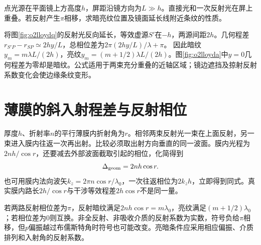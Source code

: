 \begin{example}\label{ex:o2lloyd}
点光源在平面镜上方高度$h$，屏距沿镜方向为$L\gg h$。直接光和一次反射光在屏上重叠。若反射产生$\pi$相移，求暗亮纹位置及镜面延长线附近条纹的性质。
\end{example}
\begin{solution}
将图\ref{fig:o2lloydq}的反射光反向延长，等效虚源$S'$在$-h$，两源间距$2h$。几何程差$r_{S'P}-r_{SP}\simeq2hy/L$，总相位差为$2\pi(2hy/L)/\lambda+\pi$。
因此暗纹$y_m=m\lambda L/(2h)$，亮纹$y_m=(m+1/2)\lambda L/(2h)$。图\ref{fig:o2lloyda}中$y=0$几何程差为零却是暗纹。公式适用于两束充分重叠的近轴区域；镜边遮挡及掠射反射系数变化会使边缘条纹变形。
\end{solution}

\section{薄膜的斜入射程差与反射相位}\label{th:o2film}
厚度$h$、折射率$n$的平行薄膜内折射角为$r$。相邻两束反射光一束在上面反射，另一束进入膜内往返一次再出射。比较必须取出射方向垂直的同一波面。膜内光程为$2nh/\cos r$，还要减去外部波面截取引起的相位，化简得到
\begin{equation}\label{eq:o2film}
 \Delta_{\rm geom}=2nh\cos r.
\end{equation}
也可用膜内法向波矢$k_z=2\pi n\cos r/\lambda_0$，一次往返相位为$2k_zh$，立即得到同式。真实膜内路长$2h/\cos r$与干涉等效程差$2h\cos r$不是同一量。

若两路反射相位差为$\pi$，反射暗纹满足$2nh\cos r=m\lambda_0$，亮纹满足$(m+1/2)\lambda_0$；若相位差为0则互换。非全反射、非吸收介质的反射系数为实数，符号负给$\pi$相移，但$p$偏振越过布儒斯特角时符号也可能改变。亮暗条件应采用相应偏振、介质排列和入射角的反射系数。

